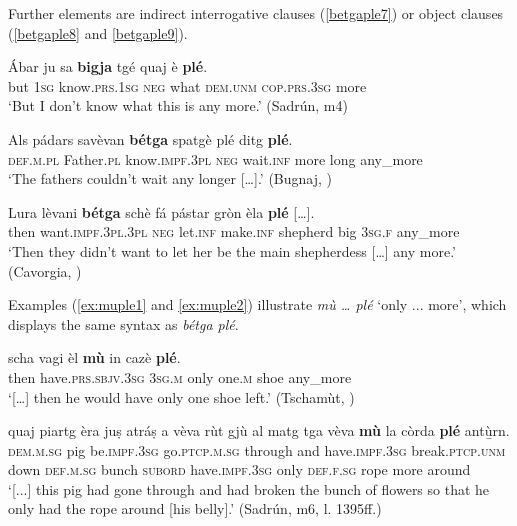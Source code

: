 Further elements are indirect interrogative clauses (\ref{betgaple7}) or object clauses (\ref{betgaple8} and \ref{betgaple9}).

\ea
\label{betgaple7}
\gll Ábar ju sa \textbf{bigja} tgé quaj è \textbf{plé}.\\
but \textsc{1sg} know.\textsc{prs.1sg} \textsc{neg} what \textsc{dem.unm} \textsc{cop.prs.3sg} more\\
\glt `But I don't know what this is any more.' (Sadrún, m4)
\z

\ea
\label{betgaple8}
\gll    Als pádars savèvan \textbf{bétga} spatgè plé ditg \textbf{plé}.\\
      \textsc{def.m.pl} Father.\textsc{pl} know.\textsc{impf.3pl} \textsc{neg} wait.\textsc{inf} more long any\_more\\
\glt `The fathers couldn’t wait any longer […].' (Bugnaj, \citealt[147]{Büchli1966})
\z

\ea
\label{betgaple9}
\gll    Lura lèvani \textbf{bétga} schè fá pástar gròn èla \textbf{plé} […].\\
     then want.\textsc{impf.3pl.3pl} \textsc{neg} let.\textsc{inf} make.\textsc{inf} shepherd big \textsc{3sg.f} any\_more\\
\glt `Then they didn’t want to let her be the main shepherdess […] any more.' (Cavorgia, \citealt[119]{Büchli1966})
\z

Examples (\ref{ex:muple1} and \ref{ex:muple2}) illustrate \textit{mù … plé} `only ... more', which displays the same syntax as \textit{bétga plé}.

\ea
\label{ex:muple1}
\gll  [...] scha vagi èl \textbf{mù} in cazè \textbf{plé}.\\
{} then have.\textsc{prs.sbjv.3sg} \textsc{3sg.m} only one.\textsc{m} shoe any\_more \\
\glt `[…] then he would have only one shoe left.' (Tschamùt, \citealt[15]{Büchli1966})
\z

\ea
\label{ex:muple2}
\gll    [..] quaj piartg èra juṣ atráṣ a vèva rùt gjù al matg tga vèva \textbf{mù} la còrda \textbf{plé} antù̱rn.\\
{} \textsc{dem.m.sg} pig be.\textsc{impf.3sg} go.\textsc{ptcp.m.sg} through and have.\textsc{impf.3sg} break.\textsc{ptcp.unm} down \textsc{def.m.sg} bunch  \textsc{subord} have.\textsc{impf.3sg} only \textsc{def.f.sg} rope more around\\
\glt `[...] this pig had gone through and had broken the bunch of flowers so that he only had the rope around [his belly].' (Sadrún, m6, l. 1395ff.)
\z

